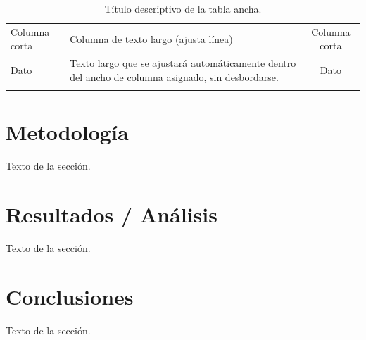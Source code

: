 \documentclass[fleqn, final]{jaes}
\begin{document}
\begin{table}[tb]
\centering
\caption{Título descriptivo de la tabla ancha.}
\label{table:ejemplo_ancho}
{\small
\begin{tabularx}{\textwidth}{@{}lYc@{}}\toprule
Columna corta & Columna de texto largo (ajusta línea) & Columna corta\\\colrule
Dato & Texto largo que se ajustará automáticamente dentro del ancho de columna asignado, sin desbordarse. & Dato\\\botrule
\end{tabularx}}
\end{table}

\section{Metodología}\label{sec:metodologia}

Texto de la sección.

\section{Resultados / Análisis}\label{sec:resultados}

Texto de la sección.

\section{Conclusiones}\label{sec:conclusiones}

Texto de la sección.

\printbibliography[title={Referencias}]

\clearpage
{}
\end{document}
